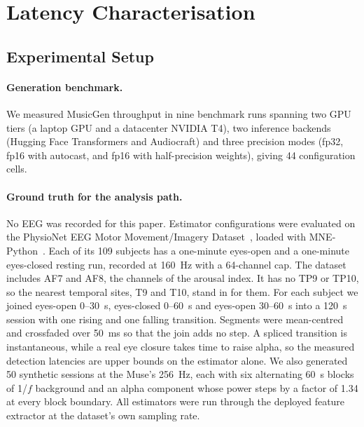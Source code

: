 \documentclass[11pt,a4paper]{article}
\begin{document}
\section{Latency Characterisation}
\label{sec:latency}

\subsection{Experimental Setup}

\paragraph{Generation benchmark.} We measured MusicGen throughput in nine benchmark runs
spanning two GPU tiers (a laptop GPU and a datacenter NVIDIA T4), two inference backends
(Hugging Face Transformers and Audiocraft) and three precision modes (fp32, fp16 with
autocast, and fp16 with half-precision weights), giving 44 configuration cells.

\paragraph{Ground truth for the analysis path.} No EEG was recorded for this paper.
Estimator configurations were evaluated on the PhysioNet EEG Motor Movement/Imagery
Dataset~\cite{schalk,physionet}, loaded with MNE-Python~\cite{mne}. Each of its 109
subjects has a one-minute eyes-open and a one-minute eyes-closed resting run, recorded at
160~Hz with a 64-channel cap. The dataset includes AF7 and AF8, the channels of the
arousal index. It has no TP9 or TP10, so the nearest temporal sites, T9 and T10, stand in
for them. For each subject we joined eyes-open 0--30~s, eyes-closed 0--60~s and eyes-open
30--60~s into a 120~s session with one rising and one falling transition. Segments were
mean-centred and crossfaded over 50~ms so that the join adds no step. A spliced transition
is instantaneous, while a real eye closure takes time to raise alpha, so the measured
detection latencies are upper bounds on the estimator alone. We also generated 50 synthetic
sessions at the Muse's 256~Hz, each with six alternating 60~s blocks of 1/$f$ background
and an alpha component whose power steps by a factor of 1.34 at every block boundary. All
estimators were run through the deployed feature extractor at the dataset's own sampling
rate.
\end{document}
